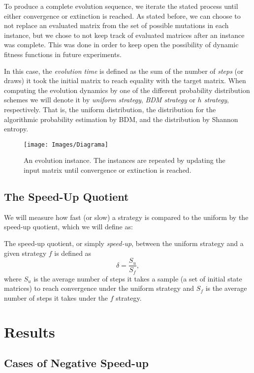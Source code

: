 \documentclass[10pt]{article}
\begin{document}
To produce a complete evolution sequence, we iterate the stated process until either convergence or extinction is reached. As stated before, we can choose to not replace an evaluated matrix from the set of possible mutations in each instance, but we chose to not keep track of evaluated matrices after an instance was complete. This was done in order to keep open the possibility of dynamic fitness functions in future experiments.

In this case, the \textit{evolution time} is defined as the sum of the number of \textit{steps} (or draws) it took the initial matrix to reach equality with the target matrix. When computing the evolution dynamics by one of the different probability distribution schemes we will denote it by \textit{uniform strategy}, \textit{BDM strategy} or \textit{$h$ strategy}, respectively. That is, the uniform distribution, the distribution for the algorithmic probability estimation by BDM, and the distribution by Shannon entropy.

\begin{figure}[ht!]
\centering
\texttt{[image: Images/Diagrama]}
\caption{An evolution instance. The instances are repeated by updating the input matrix until convergence or extinction is reached. \label{workflow}}
\end{figure}

\subsection{The Speed-Up Quotient}

We will measure how fast (or slow) a strategy is compared to the uniform by the speed-up quotient, which we will define as: 

\begin{defn}\label{speedUP}
    The speed-up quotient, or simply \textit{speed-up}, between the uniform strategy and a given strategy $f$ is defined as $$\delta=\frac{S_u}{S_f},$$ where $S_u$ is the average number of steps it takes a sample (a set of initial state matrices) to reach convergence under the uniform strategy and $S_f$ is the average number of steps it takes under the $f$ strategy. 
\end{defn}


\section{Results}

\subsection{Cases of Negative Speed-up}
\end{document}
